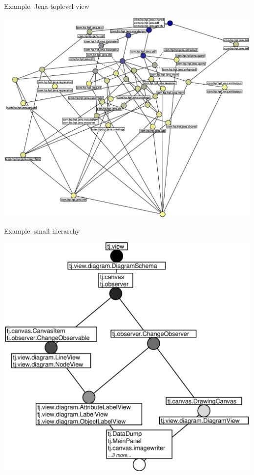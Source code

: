\documentclass[pdf,prettybox]{prosper}
\begin{document}
\begin{slide}{Example: Jena toplevel view}
 \begin{center}
 \includegraphics[width = \textwidth]{img/jenaToplevelDependencies.eps}
\end{center}
\end{slide}

\begin{slide}{Example: small hierarchy}
 \begin{center}
 \includegraphics[height = 0.8 \textheight]{img/derives-4.eps}
\end{center}
\end{slide}
\end{document}
